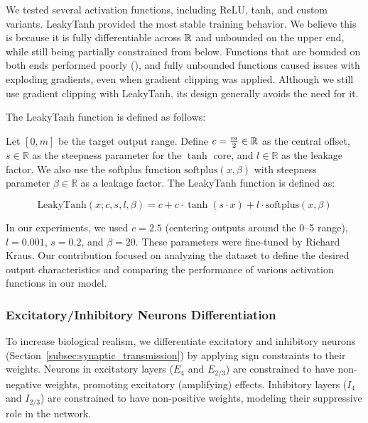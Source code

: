 We tested several activation functions, including ReLU, tanh, and custom variants. LeakyTanh provided the most stable training behavior. We believe this is because it is fully differentiable across $\mathbb{R}$ and unbounded on the upper end, while still being partially constrained from below. Functions that are bounded on both ends performed poorly (\citet{shiv2022activation, nwankpa2018activationfunctionscomparisontrends}), and fully unbounded functions caused issues with exploding gradients, even when gradient clipping was applied. Although we still use gradient clipping with LeakyTanh, its design generally avoids the need for it.

The LeakyTanh function is defined as follows:

\begin{defn}[LeakyTanh]
    Let $[0, m]$ be the target output range. Define $c = \frac{m}{2} \in \mathbb{R}$ as the central offset, $s \in \mathbb{R}$ as the steepness parameter for the $\tanh$ core, and $l \in \mathbb{R}$ as the leakage factor. We also use the softplus function $\text{softplus}(x, \beta)$ with steepness parameter $\beta \in \mathbb{R}$ as a leakage factor. The LeakyTanh function is defined as:
    
    $$\text{LeakyTanh}(x; c, s, l, \beta) = c + c \cdot \tanh(s \cdot x) + l \cdot \text{softplus}(x, \beta)$$
\end{defn}
\label{def:leakytanh}

In our experiments, we used $c = 2.5$ (centering outputs around the 0--5 range), $l = 0.001$, $s = 0.2$, and $\beta = 20$. These parameters were fine-tuned by Richard Kraus. Our contribution focused on analyzing the dataset to define the desired output characteristics and comparing the performance of various activation functions in our model.

\subsubsection{Excitatory/Inhibitory Neurons Differentiation}
\label{subsubsec:exc_inh_differentiation}

To increase biological realism, we differentiate excitatory and inhibitory neurons (Section~\ref{subsec:synaptic_transmission}) by applying sign constraints to their weights. Neurons in excitatory layers ($E_4$ and $E_{2/3}$) are constrained to have non-negative weights, promoting excitatory (amplifying) effects. Inhibitory layers ($I_4$ and $I_{2/3}$) are constrained to have non-positive weights, modeling their suppressive role in the network.


